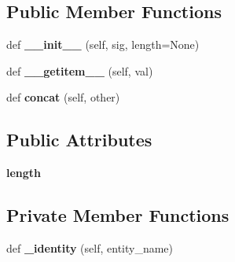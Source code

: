 \subsection*{Public Member Functions}
\begin{DoxyCompactItemize}
\item 
def {\bfseries \+\_\+\+\_\+init\+\_\+\+\_\+} (self, sig, length=None)\hypertarget{classpython_1_1dg__tools_1_1utils_1_1VectorSignal_a6647fc2c2a69d5f05e72d8842204d893}{}\label{classpython_1_1dg__tools_1_1utils_1_1VectorSignal_a6647fc2c2a69d5f05e72d8842204d893}

\item 
def {\bfseries \+\_\+\+\_\+getitem\+\_\+\+\_\+} (self, val)\hypertarget{classpython_1_1dg__tools_1_1utils_1_1VectorSignal_aa96c5cee8cc77d33f5489bd2e9f1646f}{}\label{classpython_1_1dg__tools_1_1utils_1_1VectorSignal_aa96c5cee8cc77d33f5489bd2e9f1646f}

\item 
def {\bfseries concat} (self, other)\hypertarget{classpython_1_1dg__tools_1_1utils_1_1VectorSignal_a9849ef73dd38b47c751f2b0abcd3e1d8}{}\label{classpython_1_1dg__tools_1_1utils_1_1VectorSignal_a9849ef73dd38b47c751f2b0abcd3e1d8}

\end{DoxyCompactItemize}
\subsection*{Public Attributes}
\begin{DoxyCompactItemize}
\item 
{\bfseries length}\hypertarget{classpython_1_1dg__tools_1_1utils_1_1VectorSignal_a2b26ac0cc2a66a9f2172d870befb482c}{}\label{classpython_1_1dg__tools_1_1utils_1_1VectorSignal_a2b26ac0cc2a66a9f2172d870befb482c}

\end{DoxyCompactItemize}
\subsection*{Private Member Functions}
\begin{DoxyCompactItemize}
\item 
def {\bfseries \+\_\+identity} (self, entity\+\_\+name)\hypertarget{classpython_1_1dg__tools_1_1utils_1_1VectorSignal_a6d05ccf615c9640dd444a475f0ec0db3}{}\label{classpython_1_1dg__tools_1_1utils_1_1VectorSignal_a6d05ccf615c9640dd444a475f0ec0db3}

\end{DoxyCompactItemize}
